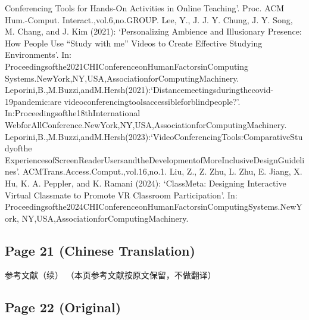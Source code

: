 \documentclass[12pt]{ctexart}
\begin{document}
Conferencing Tools for Hands-On Activities in Online Teaching’. Proc. ACM Hum.-Comput.
Interact.,vol.6,no.GROUP.
Lee, Y., J. J. Y. Chung, J. Y. Song, M. Chang, and J. Kim (2021): ‘Personalizing Ambience and
Illusionary Presence: How People Use “Study with me” Videos to Create Effective Studying
Environments’. In: Proceedingsofthe2021CHIConferenceonHumanFactorsinComputing
Systems.NewYork,NY,USA,AssociationforComputingMachinery.
Leporini,B.,M.Buzzi,andM.Hersh(2021):‘Distancemeetingsduringthecovid-19pandemic:are
videoconferencingtoolsaccessibleforblindpeople?’. In:Proceedingsofthe18thInternational
WebforAllConference.NewYork,NY,USA,AssociationforComputingMachinery.
Leporini,B.,M.Buzzi,andM.Hersh(2023):‘VideoConferencingTools:ComparativeStudyofthe
ExperiencesofScreenReaderUsersandtheDevelopmentofMoreInclusiveDesignGuidelines’.
ACMTrans.Access.Comput.,vol.16,no.1.
Liu, Z., Z. Zhu, L. Zhu, E. Jiang, X. Hu, K. A. Peppler, and K. Ramani (2024): ‘ClassMeta:
Designing Interactive Virtual Classmate to Promote VR Classroom Participation’. In:
Proceedingsofthe2024CHIConferenceonHumanFactorsinComputingSystems.NewYork,
NY,USA,AssociationforComputingMachinery.

\subsection*{Page 21 (Chinese Translation)}

参考文献（续）
（本页参考文献按原文保留，不做翻译）

\subsection*{Page 22 (Original)}
\end{document}
